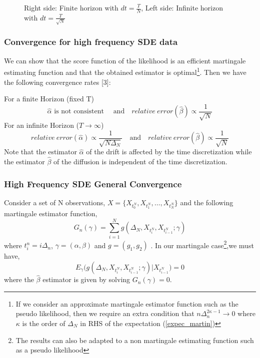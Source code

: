 \documentclass[aspectratio=169]{beamer}\usepackage[utf8]{inputenc}
\begin{document}
\begin{frame}
\begin{figure}
  \caption{Right side: Finite horizon with $dt=\frac{T}{N}$, Left side: Infinite horizon with $dt=\frac{T}{\sqrt{N}}$   }
\end{figure}

\end{frame}





\begin{frame}\frametitle{Convergence for high frequency SDE data}
We can show that the score function of the likelihood is an efficient martingale estimating function and that the obtained estimator is optimal\footnote{If we consider an approximate martingale estimator function such as the pseudo likelihood, then we require an extra condition that $n \Delta_n^{2 \kappa - 1} \to 0 $ where $\kappa$ is the order of $\Delta_N$ in RHS of the expectation (\ref{expec_martin})}. Then we have the following convergence rates [3]:

For a finite Horizon (fixed T)
\begin{equation}
\hat{\alpha} \text{ is not consistent } \quad \text{and} \quad relative \ error(\hat{\beta}) \propto \frac{1}{\sqrt{N}}
\end{equation}
For an infinite Horizon ($T \to \infty$)
\begin{equation}
relative \ error(\hat{\alpha})  \propto \frac{1}{\sqrt{N\Delta_N}} \quad \text{and} \quad  relative \ error(\hat{\beta}) \propto \frac{1}{\sqrt{N}} 
\end{equation}
Note that the estimator $\hat{\alpha}$ of the drift is affected by the time discretization while the estimator $\hat{\beta}$ of the diffusion is independent of the time discretization.

\end{frame}


\begin{frame}\frametitle{High Frequency  SDE General Convergence }
Consider a set of N observations, $X= \{ X_{t_0^N} , X_{t_1^N} ,\ldots , X_{t_N^N} \}$ and the following martingale estimator function,
\begin{equation}
G_n(\gamma) = \sum\limits_{i=1}^N g(\Delta_N , X_{t_{i}^N},X_{t_{i-1}^N} ; \gamma )
\end{equation}
where $t_{i}^n = i \Delta_n $, $\gamma = (\alpha, \beta)$ and $g=(g_1, g_2)$ .
In our martingale case\footnote{The results can also be adapted to a non martingale estimating function such as a pseudo likelihood},we must have,
\begin{equation}
E_\gamma \Big(    g(\Delta_N , X_{t_{i}^N},X_{t_{i-1}^N} ; \gamma) \Big| X_{t_{i-1}^N}  \Big) = 0
\label{expec_martin}
\end{equation} where the $\hat{\beta}$ estimator is given by solving $ G_n(\gamma) = 0 $.

\end{frame}
\end{document}
